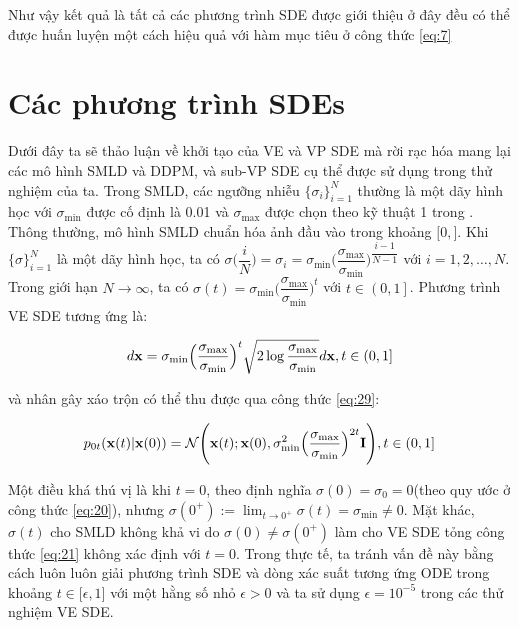 \documentclass{article} %
\begin{document}
Như vậy kết quả là tất cả các phương trình SDE được giới thiệu ở đây đều có thể được huấn luyện một cách hiệu quả với hàm mục tiêu ở công thức \ref{eq:7}

\section{Các phương trình SDEs}

Dưới đây ta sẽ thảo luận về khởi tạo của VE và VP SDE mà rời rạc hóa mang lại các mô hình SMLD và DDPM, và sub-VP SDE cụ thể được sử dụng trong thử nghiệm của ta.
Trong SMLD, các ngưỡng nhiễu $\lbrace \sigma_i \rbrace_{i=1}^N$ thường là một dãy hình học với $\sigma_{\min}$ được cố định là 0.01 và $\sigma_{\max}$ được chọn theo kỹ thuật 1 trong \citep{song2020improved}.
Thông thường, mô hình SMLD chuẩn hóa ảnh đầu vào trong khoảng $\lbrack 0, \rbrack$.
Khi $\lbrace \sigma \rbrace_{i=1}^N$ là một dãy hình học, ta có $\sigma\big( \dfrac{i}{N} \big)=\sigma_i=\sigma_{\min} \Big( \dfrac{\sigma_{\max}}{\sigma_{\min}} \Big)^{\dfrac{i-1}{N-1}}$ với $i=1, 2, \dots, N$.
Trong giới hạn $N \rightarrow \infty$, ta có $\sigma(t) = \sigma_{\min} \Big( \dfrac{\sigma_{\max}}{\sigma_{\min}} \Big)^t$ với $t \in \left ( 0, 1 \right ]$.
Phương trình VE SDE tương ứng là:

\begin{equation} \label{eq:30}
    d \bold{x} = \sigma_{\min} \Big( \dfrac{\sigma_{\max}}{\sigma_{\min}} \Big)^t \sqrt{2 \log \dfrac{\sigma_{\max}}{\sigma_{\min}}} d \bold{x}, t \in \left ( 0, 1 \right ]
\end{equation}

và nhân gây xáo trộn có thể thu được qua công thức \ref{eq:29}:

\begin{equation} \label{eq:31}
    p_{0t}(\bold{x} (t) \vert \bold{x}(0)) = \mathcal{N} \Bigg ( \bold{x}(t); \bold{x}(0), \sigma_{\min}^2 \Big( \dfrac{\sigma_{\max}}{\sigma_{\min}} \Big)^{2t} \bold{I} \Bigg), t \in \left ( 0, 1 \right ]
\end{equation}

Một điều khá thú vị là khi $t=0$, theo định nghĩa $\sigma(0) = \sigma_0 = 0$(theo quy ước ở công thức \ref{eq:20}), nhưng $\sigma(0^+):=\lim_{t \rightarrow 0^+}\sigma(t)= \sigma_{\min} \neq 0$.
Mặt khác, $\sigma(t)$ cho SMLD không khả vi do $\sigma(0) \neq \sigma(0^+)$ làm cho VE SDE tỏng công thức \ref{eq:21} không xác định với $t=0$.
Trong thực tế, ta tránh vấn đề này bằng cách luôn luôn giải phương trình SDE và dòng xác suất tương ứng ODE trong khoảng $t \in \lbrack \epsilon, 1 \rbrack$ với một hằng số nhỏ $\epsilon > 0$ và ta sử dụng $\epsilon = 10^{-5}$ trong các thử nghiệm VE SDE.
\end{document}
